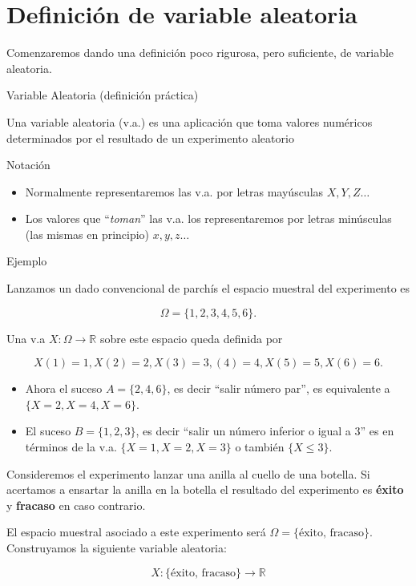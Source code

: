 \documentclass[
  letterpaper,
  DIV=11,
  numbers=noendperiod]{scrreprt}
\providecommand{\tightlist}{%
  \setlength{\itemsep}{0pt}\setlength{\parskip}{0pt}}\usepackage{longtable,booktabs,array}
\begin{document}
\section{Definición de variable
aleatoria}\label{definiciuxf3n-de-variable-aleatoria}

Comenzaremos dando una definición poco rigurosa, pero suficiente, de
variable aleatoria.

Variable Aleatoria (definición práctica)

Una variable aleatoria (v.a.) es una aplicación que toma valores
numéricos determinados por el resultado de un experimento aleatorio

Notación

\begin{itemize}
\tightlist
\item
  Normalmente representaremos las v.a. por letras mayúsculas
  \(X,Y,Z\ldots\)
\item
  Los valores que ``\emph{toman}'' las v.a. los representaremos por
  letras minúsculas (las mismas en principio) \(x,y,z\ldots\)
\end{itemize}

Ejemplo

Lanzamos un dado convencional de parchís el espacio muestral del
experimento es

\[\Omega=\{1,2, 3, 4,  5, 6\}.\]

Una v.a \(X:\Omega\to\mathbb{R}\) sobre este espacio queda definida por

\[X(1)=1, X(2)=2, X(3)=3, (4)=4, X(5)=5, X(6)=6.\]

\begin{itemize}
\tightlist
\item
  Ahora el suceso \(A=\{2, 4, 6\}\), es decir ``salir número par'', es
  equivalente a \(\{X=2,X=4,X=6\}\).
\item
  El suceso \(B=\{1,2,3\}\), es decir ``salir un número inferior o igual
  a \(3\)'' es en términos de la v.a. \(\{X=1,X=2,X=3\}\) o también
  \(\{X\leq
  3\}\).
\end{itemize}

Consideremos el experimento lanzar una anilla al cuello de una botella.
Si acertamos a ensartar la anilla en la botella el resultado del
experimento es \textbf{éxito} y \textbf{fracaso} en caso contrario.

El espacio muestral asociado a este experimento será
\(\Omega=\{\mbox{éxito, fracaso}\}\). Construyamos la siguiente variable
aleatoria:

\[X:\{\mbox{éxito, fracaso}\}\to\mathbb{R}\]
\end{document}
